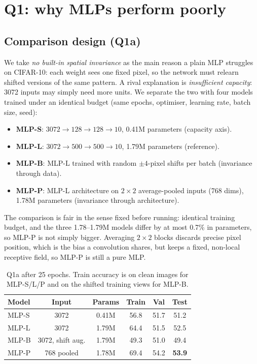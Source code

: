 \documentclass[10pt,twocolumn,letterpaper]{article}
\begin{document}
\section{Q1: why MLPs perform poorly}
\subsection{Comparison design (Q1a)}
We take \emph{no built-in spatial invariance} as the main reason a plain MLP struggles on CIFAR-10: each weight sees one fixed pixel, so the network must relearn shifted versions of the same pattern.
A rival explanation is \emph{insufficient capacity}: 3072 inputs may simply need more units.
We separate the two with four models trained under an identical budget (same epochs, optimiser, learning rate, batch size, seed):
\begin{itemize}\itemsep1pt
\item \textbf{MLP-S}: $3072{\to}128{\to}128{\to}10$, 0.41M parameters (capacity axis).
\item \textbf{MLP-L}: $3072{\to}500{\to}500{\to}10$, 1.79M parameters (reference).
\item \textbf{MLP-B}: MLP-L trained with random $\pm4$-pixel shifts per batch (invariance through data).
\item \textbf{MLP-P}: MLP-L architecture on $2{\times}2$ average-pooled inputs (768 dims), 1.78M parameters (invariance through architecture).
\end{itemize}
The comparison is fair in the sense fixed before running: identical training budget, and the three 1.78--1.79M models differ by at most 0.7\% in parameters, so MLP-P is not simply bigger.
Averaging $2{\times}2$ blocks discards precise pixel position, which is the bias a convolution shares, but keeps a fixed, non-local receptive field, so MLP-P is still a pure MLP.

\begin{table}[t]
\centering\small
\begin{tabular}{lccccc}
\toprule
Model & Input & Params & Train & Val & Test \\
\midrule
MLP-S & 3072 & 0.41M & 56.8 & 51.7 & 51.2 \\
MLP-L & 3072 & 1.79M & 64.4 & 51.5 & 52.5 \\
MLP-B & 3072, shift aug. & 1.79M & 49.3 & 51.0 & 49.4 \\
MLP-P & 768 pooled & 1.78M & 69.4 & 54.2 & \textbf{53.9} \\
\bottomrule
\end{tabular}
\caption{Q1a after 25 epochs. Train accuracy is on clean images for MLP-S/L/P and on the shifted training views for MLP-B.}
\label{tab:q1a}
\end{table}
\end{document}
